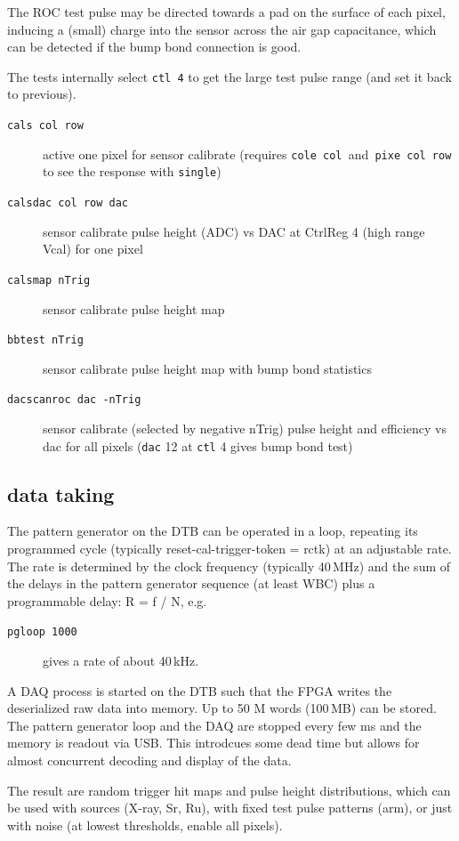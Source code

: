 \documentclass[english]{article}
\begin{document}
The ROC test pulse may be directed towards a pad on the surface of
each pixel, inducing a (small) charge into the sensor across the air
gap capacitance, which can be detected if the bump bond connection
is good.

The tests internally select \texttt{ctl 4} to get the large test pulse
range (and set it back to previous). 
\begin{description}
\item [\texttt{cals\ col\ row}] active one pixel for sensor
calibrate (requires \texttt{cole col }and\texttt{ pixe col row} to
see the response with \texttt{single}) 
\item [\texttt{calsdac\ col\ row\ dac}] sensor calibrate pulse height (ADC)
vs DAC at CtrlReg 4 (high range Vcal) for one pixel 
\item [\texttt{calsmap\ nTrig}] sensor calibrate pulse height
map 
\item [\texttt{bbtest\ nTrig}] sensor calibrate pulse height
map with bump bond statistics 
\item [\texttt{dacscanroc\ dac\ -nTrig}] sensor calibrate (selected by
negative nTrig) pulse height and efficiency vs dac for all pixels
(\texttt{dac} 12 at \texttt{ctl} 4 gives bump bond test) 
\end{description}

\subsection{data taking}

The pattern generator on the DTB can be operated in a loop, repeating
its programmed cycle (typically reset-cal-trigger-token = rctk) at
an adjustable rate. The rate is determined by the clock frequency
(typically 40\,MHz) and the sum of the delays in the pattern generator
sequence (at least WBC) plus a programmable delay: R = f / N, e.g. 
\begin{description}
\item [\texttt{pgloop\ 1000}] gives a rate of about 40\,kHz. 
\end{description}
A DAQ process is started on the DTB such that the FPGA writes the
deserialized raw data into memory. Up to 50 M words (100\,MB) can
be stored. The pattern generator loop and the DAQ are stopped every
few ms and the memory is readout via USB. This introdcues some dead
time but allows for almost concurrent decoding and display of the
data.

The result are random trigger hit maps and pulse height distributions,
which can be used with sources (X-ray, Sr, Ru), with fixed test pulse
patterns (arm), or just with noise (at lowest thresholds, enable all
pixels).
\end{document}
